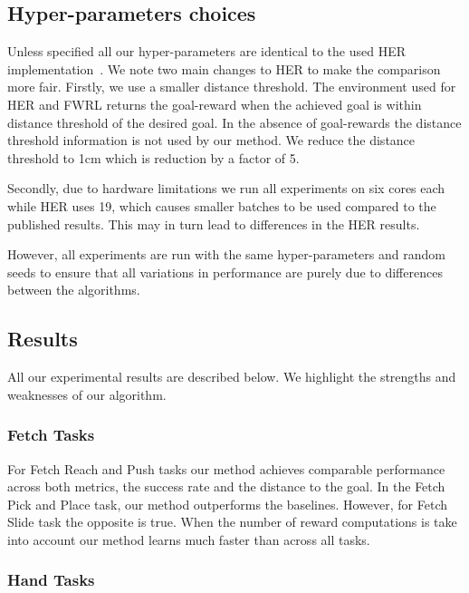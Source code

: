 %


\subsection{Hyper-parameters choices}
Unless specified all our hyper-parameters are identical to the used HER
implementation~\citep{dhariwal2017baselines}. We note two main changes
to HER to make the comparison more fair. Firstly,
we use a smaller distance threshold.
The environment used for HER and FWRL returns the goal-reward when the
achieved goal is within distance threshold of the desired goal. In the absence
of goal-rewards the distance threshold information is not used by our
method.
We reduce the distance threshold to 1cm which
is reduction by a factor of 5.

Secondly, due to hardware limitations we run all experiments on six
cores each
while HER uses 19, which causes smaller batches to be used compared to the
published results. This may in turn lead to differences in the HER results.

However, all experiments are run with the same hyper-parameters and
random seeds to ensure that all variations in performance are purely due
to differences between the algorithms.

\subsection{Results}
All our experimental results are described below. We highlight the strengths and
weaknesses of our algorithm.

\subsubsection{Fetch Tasks}

For Fetch Reach and Push tasks our method achieves comparable performance
across both metrics, the success rate and the distance to the goal. In the Fetch
Pick and Place task, our method outperforms the baselines. However, for Fetch
Slide task the opposite is true.
When the number of reward computations is take into account our method learns
much faster than across all tasks.

\subsubsection{Hand Tasks}

